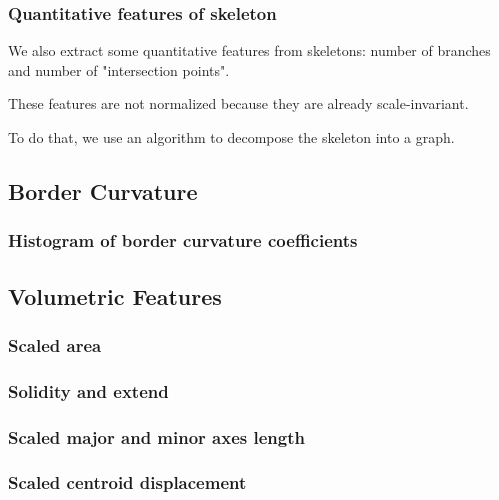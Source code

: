\documentclass[12pt]{article}
\begin{document}
\subsubsection{Quantitative features of skeleton}
We also extract some quantitative features from skeletons: number of branches and number of "intersection points".

These features are not normalized because they are already scale-invariant.

To do that, we use an algorithm to decompose the skeleton into a graph.

\subsection{Border Curvature}
\subsubsection{Histogram of border curvature coefficients}

\subsection{Volumetric Features}
\subsubsection{Scaled area}
\subsubsection{Solidity and extend}
\subsubsection{Scaled major and minor axes length}
\subsubsection{Scaled centroid displacement}
\end{document}

